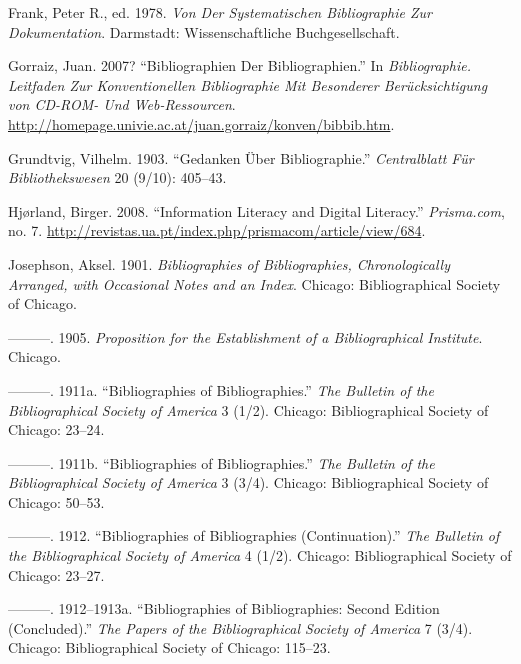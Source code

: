 \documentclass[a4paper,
fontsize=11pt,
oneside,
numbers=noperiodatend,
parskip=half-,
bibliography=totoc,
final
]{scrartcl}
\begin{document}
Frank, Peter R., ed. 1978. \emph{Von Der Systematischen Bibliographie
Zur Dokumentation}. Darmstadt: Wissenschaftliche Buchgesellschaft.

Gorraiz, Juan. 2007? ``Bibliographien Der Bibliographien.'' In
\emph{Bibliographie. Leitfaden Zur Konventionellen Bibliographie Mit
Besonderer Berücksichtigung von CD-ROM- Und Web-Ressourcen}.
\url{http://homepage.univie.ac.at/juan.gorraiz/konven/bibbib.htm}.

Grundtvig, Vilhelm. 1903. ``Gedanken Über Bibliographie.''
\emph{Centralblatt Für Bibliothekswesen} 20 (9/10): 405--43.

Hjørland, Birger. 2008. ``Information Literacy and Digital Literacy.''
\emph{Prisma.com}, no. 7.
\url{http://revistas.ua.pt/index.php/prismacom/article/view/684}.

Josephson, Aksel. 1901. \emph{Bibliographies of Bibliographies,
Chronologically Arranged, with Occasional Notes and an Index}. Chicago:
Bibliographical Society of Chicago.

---------. 1905. \emph{Proposition for the Establishment of a
Bibliographical Institute}. Chicago.

---------. 1911a. ``Bibliographies of Bibliographies.'' \emph{The
Bulletin of the Bibliographical Society of America} 3 (1/2). Chicago:
Bibliographical Society of Chicago: 23--24.

---------. 1911b. ``Bibliographies of Bibliographies.'' \emph{The
Bulletin of the Bibliographical Society of America} 3 (3/4). Chicago:
Bibliographical Society of Chicago: 50--53.

---------. 1912. ``Bibliographies of Bibliographies (Continuation).''
\emph{The Bulletin of the Bibliographical Society of America} 4 (1/2).
Chicago: Bibliographical Society of Chicago: 23--27.

---------. 1912--1913a. ``Bibliographies of Bibliographies: Second
Edition (Concluded).'' \emph{The Papers of the Bibliographical Society
of America} 7 (3/4). Chicago: Bibliographical Society of Chicago:
115--23.
\end{document}
